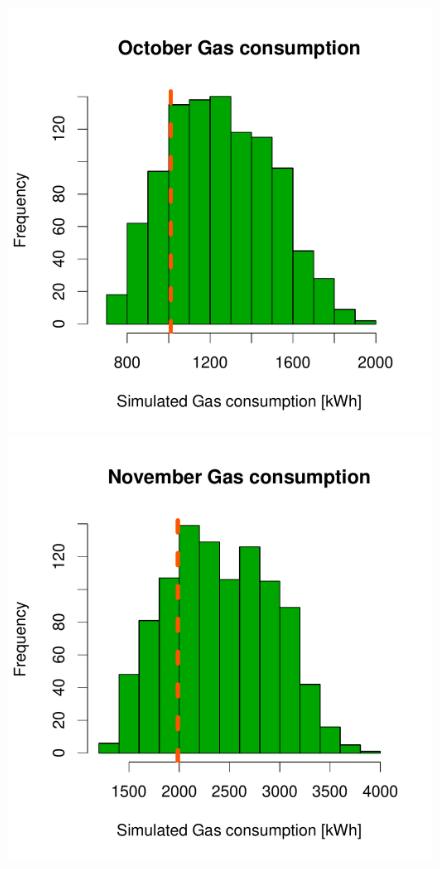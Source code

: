\documentclass[a4paper, 12pt]{article}
\begin{document}
\begin{figure}
 \includegraphics[width=\scale]{Simulation_histograms/Batch_2_Only/October_Gas}
 \includegraphics[width=\scale]{Simulation_histograms/Batch_2_Only/November_Gas}

\end{figure}
\end{document}

